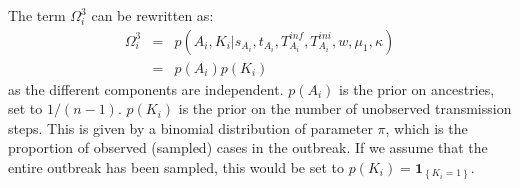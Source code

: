 \documentclass[10pt]{article}
\begin{document}
The term $\Omega_i^3$ can be rewritten as:
\begin{eqnarray}
\Omega_i^3 &=&  p(A_i, K_i| s_{A_i}, t_{A_i}, T_{A_i}^{inf}, T_{A_i}^{ini}, w, \mu_1, \kappa) \nonumber \\
      & = &   p(A_i) p(K_i)
\end{eqnarray}
as the different components are independent.
$p(A_i)$ is the prior on ancestries, set to $1/(n-1)$.
$p(K_i)$ is the prior on the number of unobserved transmission steps.
This is given by a binomial distribution of parameter $\pi$, which is the proportion of observed (sampled) cases in the outbreak.
If we assume that the entire outbreak has been sampled, this would be set to $p(K_i) = \mathbf{1}_{\left\lbrace K_i=1\right\rbrace}$.
~\\
\end{document}
